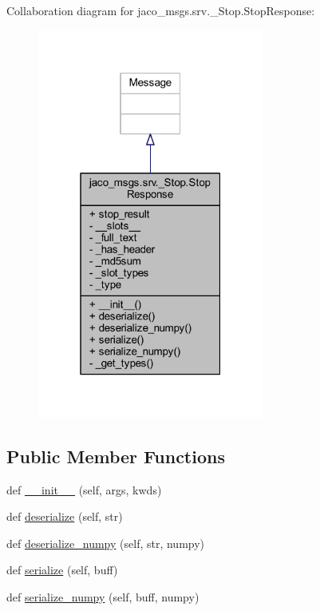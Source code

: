 Collaboration diagram for jaco\+\_\+msgs.\+srv.\+\_\+\+Stop.\+Stop\+Response\+:
\nopagebreak
\begin{figure}[H]
\begin{center}
\leavevmode
\includegraphics[width=211pt]{d8/da0/classjaco__msgs_1_1srv_1_1__Stop_1_1StopResponse__coll__graph}
\end{center}
\end{figure}
\subsection*{Public Member Functions}
\begin{DoxyCompactItemize}
\item 
def \hyperlink{classjaco__msgs_1_1srv_1_1__Stop_1_1StopResponse_ac4e2684f8a210a9322df2fa51a6a224e}{\+\_\+\+\_\+init\+\_\+\+\_\+} (self, args, kwds)
\item 
def \hyperlink{classjaco__msgs_1_1srv_1_1__Stop_1_1StopResponse_aad9bf4bb2029499f434e26ed591214fa}{deserialize} (self, str)
\item 
def \hyperlink{classjaco__msgs_1_1srv_1_1__Stop_1_1StopResponse_a05a0d6323888083b3a61437fc0196f38}{deserialize\+\_\+numpy} (self, str, numpy)
\item 
def \hyperlink{classjaco__msgs_1_1srv_1_1__Stop_1_1StopResponse_a5bef46643daf1117ce583561c2357d3a}{serialize} (self, buff)
\item 
def \hyperlink{classjaco__msgs_1_1srv_1_1__Stop_1_1StopResponse_a637940eeffcc5a745fe28d7b14e8e328}{serialize\+\_\+numpy} (self, buff, numpy)
\end{DoxyCompactItemize}
